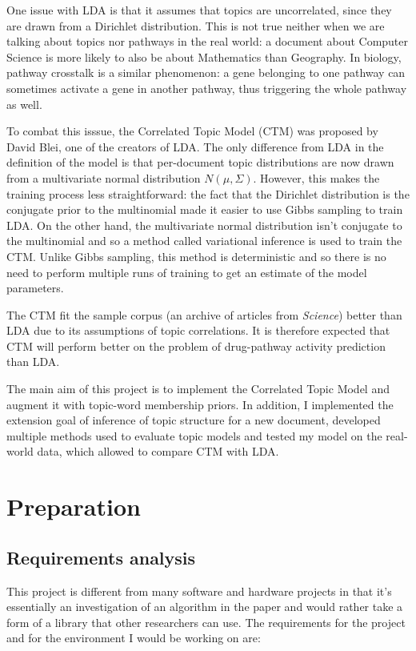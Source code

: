 \documentclass[12pt,a4paper,twoside,openright]{report}
\begin{document}
One issue with LDA is that it assumes that topics are uncorrelated, since they are drawn from a Dirichlet distribution. This is not true neither when we are talking about topics nor pathways in the real world: a document about Computer Science is more likely to also be about Mathematics than Geography. In biology, pathway crosstalk is a similar phenomenon: a gene belonging to one pathway can sometimes activate a gene in another pathway, thus triggering the whole pathway as well.

To combat this isssue, the Correlated Topic Model (CTM) \cite{2007} was proposed by David Blei, one of the creators of LDA. The only difference from LDA in the definition of the model is that per-document topic distributions are now drawn from a multivariate normal distribution $N(\mu, \Sigma)$. However, this makes the training process less straightforward: the fact that the Dirichlet distribution is the conjugate prior to the multinomial made it easier to use Gibbs sampling to train LDA. On the other hand, the multivariate normal distribution isn't conjugate to the multinomial and so a method called variational inference is used to train the CTM. Unlike Gibbs sampling, this method is deterministic and so there is no need to perform multiple runs of training to get an estimate of the model parameters.

The CTM fit the sample corpus (an archive of articles from \textit{Science}) better than LDA due to its assumptions of topic correlations. It is therefore expected that CTM will perform better on the problem of drug-pathway activity prediction than LDA.

The main aim of this project is to implement the Correlated Topic Model and augment it with topic-word membership priors. In addition, I implemented the extension goal of inference of topic structure for a new document, developed multiple methods used to evaluate topic models and tested my model on the real-world data, which allowed to compare CTM with LDA.

\chapter{Preparation}

\section{Requirements analysis}

This project is different from many software and hardware projects in that it's essentially an investigation of an algorithm in the paper and would rather take a form of a library that other researchers can use. The requirements for the project and for the environment I would be working on are:
\end{document}
